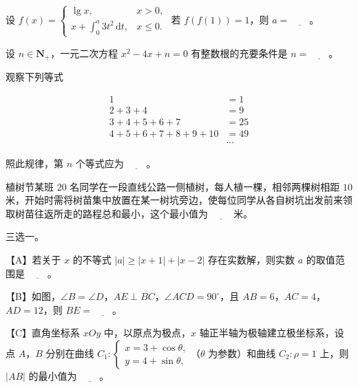 \begin{question}
设 $f(x)=\begin{cases}\lg x,&x>0,\\[2pt]x+\displaystyle\int_0^a3t^2\,\mathrm dt,&x\leqslant0.\end{cases}$ 若 $f(f(1))=1$，则 $a=\underline{\qquad}$。

\end{question}
\begin{question}
设 $n\in\mathbf N_+$，一元二次方程 $x^2-4x+n=0$ 有整数根的充要条件是 $n=\underline{\qquad}$。

\end{question}
\begin{question}
观察下列等式

\nopagebreak[4]
\[\begin{aligned}
1&=1\\
2+3+4&=9\\
3+4+5+6+7&=25\\
4+5+6+7+8+9+10&=49\\
&\cdots
\end{aligned}\]

照此规律，第 $n$ 个等式应为 $\underline{\qquad}$。

\end{question}
\begin{question}
植树节某班 $20$ 名同学在一段直线公路一侧植树，每人植一棵，相邻两棵树相距 $10$ 米，开始时需将树苗集中放置在某一树坑旁边，使每位同学从各自树坑出发前来领取树苗往返所走的路程总和最小，这个最小值为 $\underline{\qquad}$ 米。

\Needspace{0.4\textheight}
\end{question}
\begin{question}
三选一。

【A】若关于 $x$ 的不等式 $|a|\geqslant|x+1|+|x-2|$ 存在实数解，则实数 $a$ 的取值范围是 $\underline{\qquad}$。

【B】如图，$\angle B=\angle D$，$AE\perp BC$，$\angle ACD=90^\circ$，且 $AB=6$，$AC=4$，$AD=12$，则 $BE=\underline{\qquad}$。
\nopagebreak[4]
\begin{center}\end{center}
\nopagebreak[4]
【C】直角坐标系 $xOy$ 中，以原点为极点，$x$ 轴正半轴为极轴建立极坐标系，设点 $A$，$B$ 分别在曲线 $C_1:\begin{cases}x=3+\cos\theta,\\y=4+\sin\theta,\end{cases}$（$\theta$ 为参数）和曲线 $C_2:\rho=1$ 上，则 $|AB|$ 的最小值为 $\underline{\qquad}$。

\end{question}

